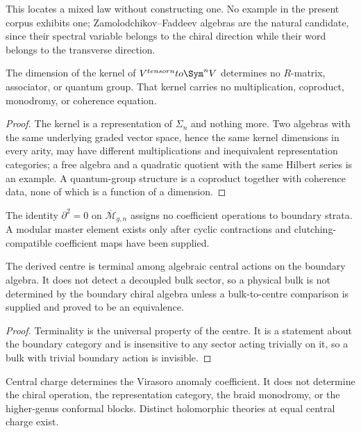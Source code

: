 This locates a mixed law without constructing one. No example in the present
corpus exhibits one; Zamolodchikov--Faddeev algebras are the natural candidate,
since their spectral variable belongs to the chiral direction while their word
belongs to the transverse direction.

\begin{theorem}
\label{nogo:dimension-loss-spine}
The dimension of the kernel of $V^{\otimes n}\to\Sym^nV$ determines no
$R$-matrix, associator, or quantum group. That kernel carries no
multiplication, coproduct, monodromy, or coherence equation.
\end{theorem}
\begin{proof}
The kernel is a representation of $\Sigma_n$ and nothing more. Two algebras
with the same underlying graded vector space, hence the same kernel dimensions
in every arity, may have different multiplications and inequivalent
representation categories; a free algebra and a quadratic quotient with the
same Hilbert series is an example. A quantum-group structure is a coproduct
together with coherence data, none of which is a function of a dimension.
\end{proof}

\begin{theorem}
The identity $\partial^2=0$ on $\overline{\mathcal M}_{g,n}$ assigns no
coefficient operations to boundary strata. A modular master element exists only
after cyclic contractions and clutching-compatible coefficient maps have been
supplied.
\end{theorem}

\begin{theorem}
The derived centre is terminal among algebraic central actions on the boundary
algebra. It does not detect a decoupled bulk sector, so a physical bulk is not
determined by the boundary chiral algebra unless a bulk-to-centre comparison is
supplied and proved to be an equivalence.
\end{theorem}
\begin{proof}
Terminality is the universal property of the centre. It is a statement about
the boundary category and is insensitive to any sector acting trivially on it,
so a bulk with trivial boundary action is invisible.
\end{proof}

\begin{theorem}
Central charge determines the Virasoro anomaly coefficient. It does not
determine the chiral operation, the representation category, the braid
monodromy, or the higher-genus conformal blocks. Distinct holomorphic theories
at equal central charge exist.
\end{theorem}

